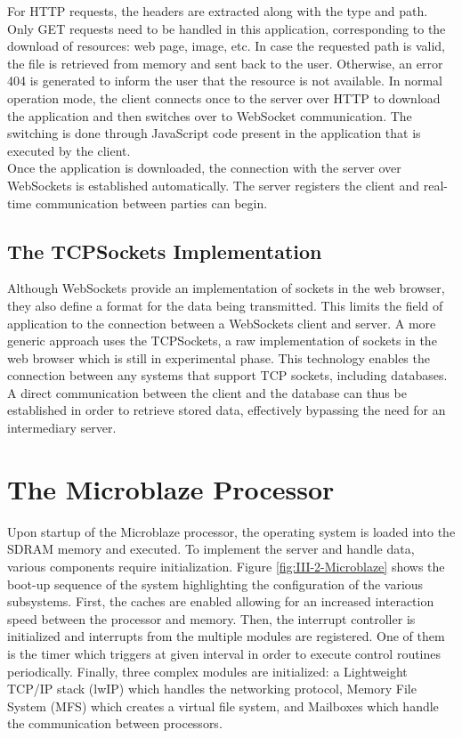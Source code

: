       For HTTP requests, the headers are extracted along with the type and path. Only GET requests need to be handled in this application, corresponding to the download of resources: web page, image, etc. In case the requested path is valid, the file is retrieved from memory and sent back to the user. Otherwise, an error 404 is generated to inform the user that the resource is not available. In normal operation mode, the client connects once to the server over HTTP to download the application and then switches over to WebSocket communication. The switching is done through JavaScript code present in the application that is executed by the client. \\

      Once the application is downloaded, the connection with the server over WebSockets is established automatically. The server registers the client and real-time communication between parties can begin.

    \subsection{The TCPSockets Implementation}

      Although WebSockets provide an implementation of sockets in the web browser, they also define a format for the data being transmitted. This limits the field of application to the connection between a WebSockets client and server. A more generic approach uses the TCPSockets, a raw implementation of sockets in the web browser which is still in experimental phase. This technology enables the connection between any systems that support TCP sockets, including databases. A direct communication between the client and the database can thus be established in order to retrieve stored data, effectively bypassing the need for an intermediary server.

  \section{The Microblaze Processor}

    Upon startup of the Microblaze processor, the operating system is loaded into the SDRAM memory and executed. To implement the server and handle data, various components require initialization. Figure \ref{fig:III-2-Microblaze} shows the boot-up sequence of the system highlighting the configuration of the various subsystems. First, the caches are enabled allowing for an increased interaction speed between the processor and memory. Then, the interrupt controller is initialized and interrupts from the multiple modules are registered. One of them is the timer which triggers at given interval in order to execute control routines periodically. Finally, three complex modules are initialized: a Lightweight TCP/IP stack (lwIP) which handles the networking protocol, Memory File System (MFS) which creates a virtual file system, and Mailboxes which handle the communication between processors.

